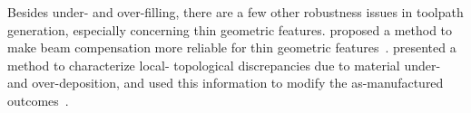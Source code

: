 Besides under- and over-filling, there are a few other robustness issues in toolpath generation, especially concerning thin geometric features.
\citeauthor{Moesen2011} proposed a method to make beam compensation more reliable for thin geometric features~\cite{Moesen2011}.
\citeauthor{Behandish2019a} presented a method to characterize local- topological discrepancies due to material under- and over-deposition, and used this information to modify the as-manufactured outcomes~\cite{Behandish2019a}.














